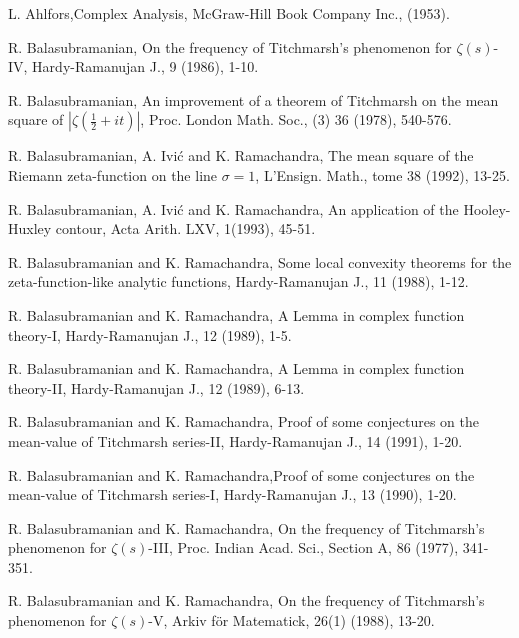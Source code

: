\begin{thebibliography}{99}
 L. Ahlfors,\pageoriginale Complex Analysis, McGraw-Hill Book Company Inc., (1953).

 R. Balasubramanian, On the frequency of Titchmarsh's phenomenon for  $\zeta(s)$-IV, Hardy-Ramanujan J., 9 (1986), 1-10.

 R. Balasubramanian, An improvement of a theorem of Titchmarsh on the mean square of $|\zeta(\frac{1}{2} + it)|$, Proc. London Math. Soc., (3) 36 (1978), 540-576.

 R. Balasubramanian, A. Ivi\'c and K. Ramachandra, The mean square of the Riemann zeta-function on the line $\sigma =1$, L'Ensign. Math., tome 38 (1992), 13-25.

 R. Balasubramanian, A. Ivi\'c and K. Ramachandra, An application of the Hooley-Huxley contour, Acta Arith. LXV, 1(1993), 45-51.

 R. Balasubramanian and K. Ramachandra, Some local convexity theorems for the zeta-function-like analytic functions, Hardy-Ramanujan J., 11 (1988), 1-12.

 R. Balasubramanian and K. Ramachandra, A Lemma in complex function theory-I, Hardy-Ramanujan J., 12 (1989), 1-5.

 R. Balasubramanian and K. Ramachandra, A Lemma in complex function theory-II, Hardy-Ramanujan J., 12 (1989), 6-13. 

 R. Balasubramanian and K. Ramachandra, Proof of some conjectures on the mean-value of Titchmarsh series-II, Hardy-Ramanujan J., 14 (1991), 1-20.

 R. Balasubramanian and K. Ramachandra,\pageoriginale Proof of some conjectures on the mean-value of Titchmarsh series-I, Hardy-Ramanujan J., 13 (1990), 1-20.

 R. Balasubramanian and K. Ramachandra, On the frequency of Titchmarsh's phenomenon for $\zeta(s)$-III, Proc. Indian Acad. Sci., Section A, 86 (1977), 341-351.

 R. Balasubramanian and K. Ramachandra, On the frequency of Titchmarsh's phenomenon for $\zeta(s)$-V, Arkiv f\"or Matematick, 26(1) (1988), 13-20.


\end{thebibliography}

